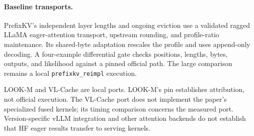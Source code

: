 \paragraph{Baseline transports.}
PrefixKV's independent layer lengths and ongoing eviction use a validated
ragged LLaMA eager-attention transport, upstream rounding, and profile-ratio
maintenance. Its shared-byte adaptation rescales the profile and uses
append-only decoding. A four-example differential gate checks positions,
lengths, bytes, outputs, and likelihood against a pinned official path.
The large comparison remains a local \texttt{prefixkv\_reimpl} execution.

LOOK-M and VL-Cache are local ports. LOOK-M's pin establishes attribution,
not official execution. The VL-Cache port does not implement the paper's
specialized fused kernels; its timing comparison concerns the measured port.
Version-specific vLLM integration and other attention backends do not establish
that HF eager results transfer to serving kernels.
